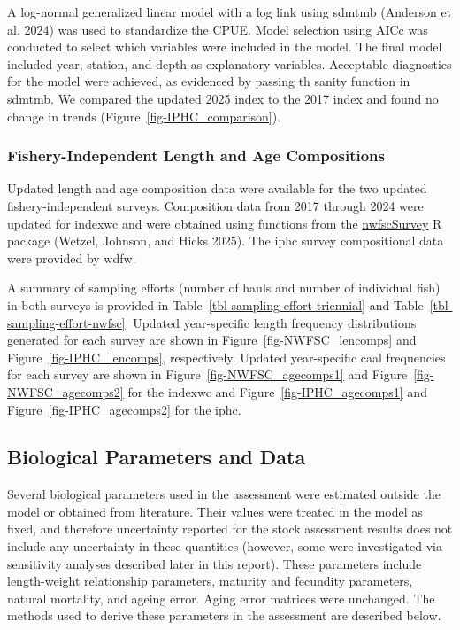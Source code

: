 \documentclass[
  english,
]{article}
\begin{document}
A log-normal generalized linear model with a log link using \gls{sdmtmb}
(Anderson et al. 2024) was used to standardize the CPUE. Model selection
using AICc was conducted to select which variables were included in the
model. The final model included year, station, and depth as explanatory
variables. Acceptable diagnostics for the model were achieved, as
evidenced by passing th sanity function in \gls{sdmtmb}. We compared the
updated 2025 index to the 2017 index and found no change in trends
(Figure~\ref{fig-IPHC_comparison}).

\subsubsection{Fishery-Independent Length and Age
Compositions}\label{fishery-independent-length-and-age-compositions}

Updated length and age composition data were available for the two
updated fishery-independent surveys. Composition data from 2017 through
2024 were updated for \gls{indexwc} and were obtained using functions
from the
\href{https://github.com/pfmc-assessments/nwfscSurvey}{nwfscSurvey} R
package (Wetzel, Johnson, and Hicks 2025). The \gls{iphc} survey
compositional data were provided by \gls{wdfw}.

A summary of sampling efforts (number of hauls and number of individual
fish) in both surveys is provided in
Table~\ref{tbl-sampling-effort-triennial} and
Table~\ref{tbl-sampling-effort-nwfsc}. Updated year-specific length
frequency distributions generated for each survey are shown in
Figure~\ref{fig-NWFSC_lencomps} and Figure~\ref{fig-IPHC_lencomps},
respectively. Updated year-specific \gls{caal} frequencies for each
survey are shown in Figure~\ref{fig-NWFSC_agecomps1} and
Figure~\ref{fig-NWFSC_agecomps2} for the \gls{indexwc} and
Figure~\ref{fig-IPHC_agecomps1} and Figure~\ref{fig-IPHC_agecomps2} for
the \gls{iphc}.

\subsection{Biological Parameters and
Data}\label{biological-parameters-and-data}

Several biological parameters used in the assessment were estimated
outside the model or obtained from literature. Their values were treated
in the model as fixed, and therefore uncertainty reported for the stock
assessment results does not include any uncertainty in these quantities
(however, some were investigated via sensitivity analyses described
later in this report). These parameters include length-weight
relationship parameters, maturity and fecundity parameters, natural
mortality, and ageing error. Aging error matrices were unchanged. The
methods used to derive these parameters in the assessment are described
below.
\end{document}
